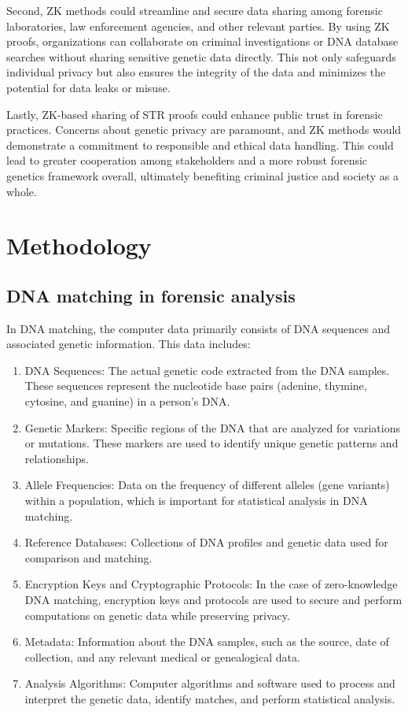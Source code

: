 \documentclass{article}
\begin{document}
Second, ZK methods could streamline and secure data sharing among forensic laboratories, law enforcement agencies, and other relevant parties. By using ZK proofs, organizations can collaborate on criminal investigations or DNA database searches without sharing sensitive genetic data directly. This not only safeguards individual privacy but also ensures the integrity of the data and minimizes the potential for data leaks or misuse.

Lastly, ZK-based sharing of STR proofs could enhance public trust in forensic practices. Concerns about genetic privacy are paramount, and ZK methods would demonstrate a commitment to responsible and ethical data handling. This could lead to greater cooperation among stakeholders and a more robust forensic genetics framework overall, ultimately benefiting criminal justice and society as a whole.

\section{Methodology}
\subsection{DNA matching in forensic analysis}

In DNA matching, the computer data primarily consists of DNA sequences and associated genetic information. This data includes:

\begin{enumerate}
  \item DNA Sequences: The actual genetic code extracted from the DNA samples. These sequences represent the nucleotide base pairs (adenine, thymine, cytosine, and guanine) in a person's DNA.
  
  \item Genetic Markers: Specific regions of the DNA that are analyzed for variations or mutations. These markers are used to identify unique genetic patterns and relationships.
  
  \item Allele Frequencies: Data on the frequency of different alleles (gene variants) within a population, which is important for statistical analysis in DNA matching.
  
  \item Reference Databases: Collections of DNA profiles and genetic data used for comparison and matching.
  
  \item Encryption Keys and Cryptographic Protocols: In the case of zero-knowledge DNA matching, encryption keys and protocols are used to secure and perform computations on genetic data while preserving privacy.
  
  \item Metadata: Information about the DNA samples, such as the source, date of collection, and any relevant medical or genealogical data.
  
  \item Analysis Algorithms: Computer algorithms and software used to process and interpret the genetic data, identify matches, and perform statistical analysis.
\end{enumerate}
\end{document}

